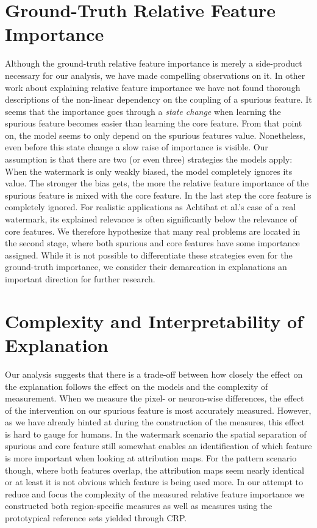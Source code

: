 \section{Ground-Truth Relative Feature Importance}
Although the ground-truth relative feature importance is merely a side-product necessary for our analysis, we have made compelling observations on it. In other work about explaining relative feature importance we have not found thorough descriptions of the non-linear dependency on the coupling of a spurious feature. It seems that the importance goes through a \textit{state change} when learning the spurious feature becomes easier than learning the core feature. From that point on, the model seems to only depend on the spurious features value. 
Nonetheless, even before this state change a slow raise of importance is visible. Our assumption is that there are two (or even three) strategies the models apply:
When the watermark is only weakly biased, the model completely ignores its value. The stronger the bias gets, the more the relative feature importance of the spurious feature is mixed with the core feature. In the last step the core feature is completely ignored. 
For realistic applications as Achtibat et al.'s \cite{Achtibat2022}  case of a real watermark, its explained relevance is often significantly below the relevance of core features. 
We therefore hypothesize that many real problems are located in the second stage, where both spurious and core features have some importance assigned. 
While it is not possible to differentiate these strategies even for the ground-truth importance, we consider their demarcation in explanations an important direction for further research.

\section{Complexity and Interpretability of Explanation}
Our analysis suggests that there is a trade-off between how closely the effect on the explanation follows the effect on the models and the complexity of measurement. 
When we measure the pixel- or neuron-wise differences, the effect of the intervention on our spurious feature is most accurately measured. 
However, as we have already hinted at during the construction of the measures, this effect is hard to gauge for humans. In the watermark scenario the spatial separation of spurious and core feature still somewhat enables an identification of which feature is more important when looking at attribution maps. For the pattern scenario though, where both features overlap, the attribution maps seem nearly identical or at least it is not obvious which feature is being used more. 
In our attempt to reduce and focus the complexity of the measured relative feature importance we constructed both region-specific measures as well as measures using the prototypical reference sets yielded through CRP. 

